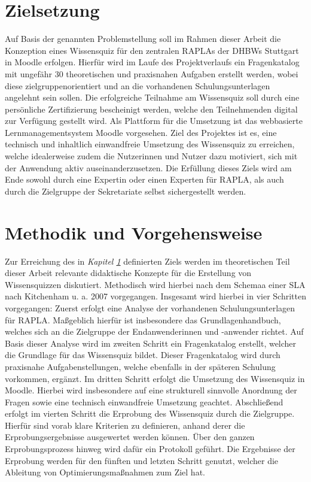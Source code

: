 \section{Zielsetzung}\label{sec:zielsetzung}
Auf Basis der genannten Problemstellung soll im Rahmen dieser Arbeit
die Konzeption eines Wissensquiz für den zentralen \acp{RAPLA} der \acp{DHBW}
Stuttgart in Moodle erfolgen.
Hierfür wird im Laufe des Projektverlaufs ein Fragenkatalog mit ungefähr 30
theoretischen und praxisnahen Aufgaben erstellt werden, wobei diese zielgruppenorientiert
und an die vorhandenen Schulungsunterlagen angelehnt sein sollen.
Die erfolgreiche Teilnahme am Wissensquiz soll durch eine persönliche Zertifizierung
bescheinigt werden, welche den Teilnehmenden digital zur Verfügung gestellt wird.
Als Plattform für die Umsetzung ist das webbasierte Lernmanagementsystem Moodle
vorgesehen.
Ziel des Projektes ist es, eine technisch und inhaltlich einwandfreie Umsetzung
des Wissensquiz zu erreichen, welche idealerweise
zudem die Nutzerinnen und Nutzer dazu motiviert, sich mit der Anwendung aktiv
auseinanderzusetzen.
Die Erfüllung dieses Ziels wird am Ende sowohl durch eine Expertin oder einen
Experten für \ac{RAPLA}, als auch durch die Zielgruppe der Sekretariate selbst
sichergestellt werden.
\section{Methodik und Vorgehensweise}
Zur Erreichung des in \textit{Kapitel \ref{sec:zielsetzung}} definierten Ziels werden
im theoretischen Teil dieser Arbeit relevante didaktische Konzepte für die Erstellung von Wissensquizzen
diskutiert. Methodisch wird hierbei nach dem Schemaa einer \ac{SLA} nach Kitchenham u. a. 2007 vorgegangen.
Insgesamt wird hierbei in vier Schritten vorgegangen:
Zuerst erfolgt eine Analyse der vorhandenen Schulungsunterlagen für \ac{RAPLA}.
Maßgeblich hierfür ist insbesondere das Grundlagenhandbuch, welches sich an die Zielgruppe der
Endanwenderinnen und -anwender richtet. Auf Basis dieser Analyse wird im zweiten Schritt
ein Fragenkatalog erstellt, welcher die Grundlage für das Wissensquiz bildet.
Dieser Fragenkatalog wird durch praxisnahe Aufgabenstellungen, welche ebenfalls
in der späteren Schulung vorkommen, ergänzt. Im dritten Schritt erfolgt die Umsetzung
des Wissensquiz in Moodle. Hierbei wird insbesondere auf eine strukturell
sinnvolle Anordnung der Fragen sowie eine technisch einwandfreie Umsetzung geachtet.
Abschließend erfolgt im vierten Schritt die Erprobung des Wissensquiz durch die Zielgruppe.
Hierfür sind vorab klare Kriterien zu definieren, anhand derer die Erprobungsergebnisse
ausgewertet werden können. Über den ganzen Erprobungsprozess hinweg wird dafür
ein Protokoll geführt. Die Ergebnisse der Erprobung werden für den fünften
und letzten Schritt genutzt, welcher die Ableitung von Optimierungsmaßnahmen
zum Ziel hat.
